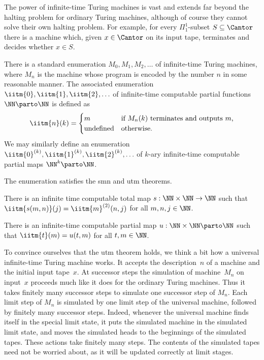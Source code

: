 The power of infinite-time Turing machines is vast and extends far beyond the halting
problem for ordinary Turing machines, although of course they cannot solve their own
halting problem. For example, for every $\Pi^1_1$-subset $S \subseteq \Cantor$ there is a machine which, given $x \in \Cantor$ on its input tape, terminates and decides whether $x \in S$.

There is a standard enumeration $M_0, M_1, M_2, \ldots$ of infinite-time Turing
machines, where $M_n$ is the machine whose program is encoded by the number $n$
in some reasonable manner. The associated enumeration $\iitm{0}, \iitm{1}, \iitm{2},
\ldots$ of infinite-time computable partial functions $\NN \parto \NN$ is
defined as
%
\begin{equation*}
  \iitm{n}(k) =
  \begin{cases}
    m & \text{if $M_n(k)$ terminates and outputs $m$,}\\
    \text{undefined} & \text{otherwise}.
  \end{cases}
\end{equation*}
%
We may similarly define an enumeration $\iitm{0}^{(k)}, \iitm{1}^{(k)}, \iitm{2}^{(k)}, \ldots$ of $k$-ary infinite-time computable partial maps $\NN^k \parto \NN$.

The enumeration satisfies the smn and utm theorems.

\begin{theorem}
  There is an infinite time computable total map $s : \NN \times \NN \to \NN$
  such that $\iitm{{s}(m,n)}(j) = \iitm{m}^{(2)}(n, j)$ for all $m, n, j \in \NN$.
\end{theorem}

\begin{theorem}
  There is an infinite-time computable partial map $u : \NN \times \NN \parto
  \NN$ such that $\iitm{t}(m) = u(t,m)$ for all $t, m \in \NN$.
\end{theorem}

\noindent
%
To convince ourselves that the utm theorem holds, we think a bit how a universal
infinite-time Turing machine works. It accepts the description~$n$ of a machine and the
initial input tape~$x$. At successor steps the simulation of machine~$M_n$ on input~$x$
proceeds much like it does for the ordinary Turing machines. Thus it takes finitely many
successor steps to simulate one successor step of $M_n$. Each limit step of $M_n$ is
simulated by one limit step of the universal machine, followed by finitely many successor
steps. Indeed, whenever the universal machine finds itself in the special limit state, it
puts the simulated machine in the simulated limit state, and moves the simulated heads to
the beginnings of the simulated tapes. These actions take finitely many steps. The
contents of the simulated tapes need not be worried about, as it will be updated correctly at limit stages.

